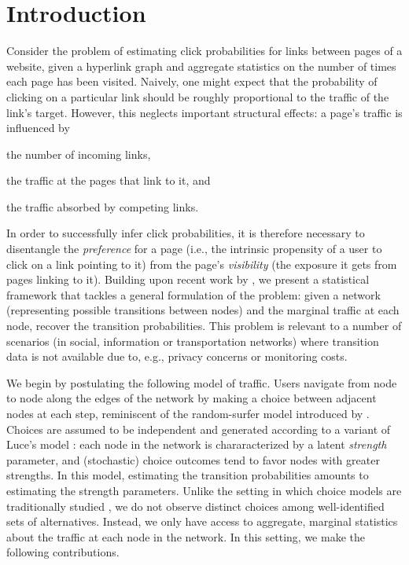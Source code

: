 \section{Introduction}  %
\label{cr:sec:intro}

Consider the problem of estimating click probabilities for links between pages of a website, given a hyperlink graph and aggregate statistics on the number of times each page has been visited.
Naively, one might expect that the probability of clicking on a particular link should be roughly proportional to the traffic of the link's target.
However, this neglects important structural effects:
a page's traffic is influenced by
\begin{enuminline}
\item the number of incoming links,
\item the traffic at the pages that link to it, and
\item the traffic absorbed by competing links.
\end{enuminline}
In order to successfully infer click probabilities, it is therefore necessary to disentangle the \emph{preference} for a page (i.e., the intrinsic propensity of a user to click on a link pointing to it) from the page's \emph{visibility} (the exposure it gets from pages linking to it).
Building upon recent work by \citet{kumar2015inverting}, we present a statistical framework that tackles a general formulation of the problem:
given a network (representing possible transitions between nodes) and the marginal traffic at each node, recover the transition probabilities.
This problem is relevant to a number of scenarios (in social, information or transportation networks) where transition data is not available due to, e.g., privacy concerns or monitoring costs.

We begin by postulating the following model of traffic.
Users navigate from node to node along the edges of the network by making a choice between adjacent nodes at each step, reminiscent of the random-surfer model introduced by \citet{brin1998anatomy}.
Choices are assumed to be independent and generated according to a variant of Luce's model \citep{luce1959individual}: each node in the network is chararacterized by a latent \emph{strength} parameter, and (stochastic) choice outcomes tend to favor nodes with greater strengths.
In this model, estimating the transition probabilities amounts to estimating the strength parameters.
Unlike the setting in which choice models are traditionally studied \citep{train2009discrete, vojnovic2016parameter}, we do not observe distinct choices among well-identified sets of alternatives.
Instead, we only have access to aggregate, marginal statistics about the traffic at each node in the network.
In this setting, we make the following contributions.

